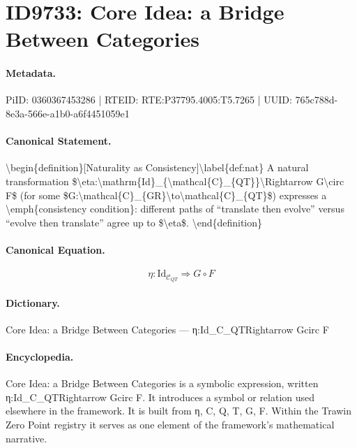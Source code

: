 \section*{ID9733: Core Idea: a Bridge Between Categories}
\paragraph{Metadata.}
PiID: 0360367453286 | RTEID: RTE:P37795.4005:T5.7265 | UUID: 765c788d-8e3a-566e-a1b0-a6f4451059e1

\paragraph{Canonical Statement.}
\textbackslash{}begin\{definition\}[Naturality as Consistency]\textbackslash{}label\{def:nat\} A natural transformation \$\textbackslash{}eta:\textbackslash{}mathrm\{Id\}\_\{\textbackslash{}mathcal\{C\}\_\{QT\}\}\textbackslash{}Rightarrow G\textbackslash{}circ F\$ (for some \$G:\textbackslash{}mathcal\{C\}\_\{GR\}\textbackslash{}to\textbackslash{}mathcal\{C\}\_\{QT\}\$) expresses a \textbackslash{}emph\{consistency condition\}: different paths of ``translate then evolve'' versus ``evolve then translate'' agree up to \$\textbackslash{}eta\$. \textbackslash{}end\{definition\}

\paragraph{Canonical Equation.}
\[
\eta:\mathrm{Id}_{\mathcal{C}_{QT}}\Rightarrow G\circ F
\]

\paragraph{Dictionary.}
Core Idea: a Bridge Between Categories — η:Id\_C\_QTRightarrow Gcirc F

\paragraph{Encyclopedia.}
Core Idea: a Bridge Between Categories is a symbolic expression, written η:Id\_C\_QTRightarrow Gcirc F. It introduces a symbol or relation used elsewhere in the framework. It is built from η, C, Q, T, G, F. Within the Trawin Zero Point registry it serves as one element of the framework's mathematical narrative.
